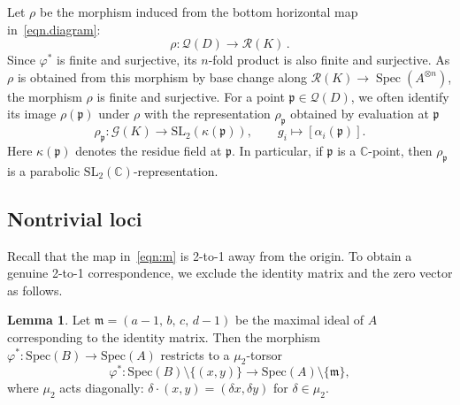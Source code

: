 \documentclass[12pt,reqno]{amsart}
\newcommand{\BC}{\mathbb{C}}
\newcommand{\calQ}{\mathcal{Q}}
\newcommand{\calG}{\mathcal{G}}
\newcommand{\calR}{\mathcal{R}}
\newcommand{\SL}{\mathrm{SL}}
\newcommand{\Spec}{\mathrm{Spec}}
\theoremstyle{definition}
\newtheorem{lemma}[theorem]{Lemma}
\begin{document}
	Let $\rho$ be the morphism induced from the bottom horizontal map in~\eqref{eqn.diagram}:
	\begin{equation} \label{eqn.rho}
		\rho : \calQ(D) \longrightarrow \calR(K)	\,.
	\end{equation}
	Since $\varphi^*$ is finite and surjective, its $n$-fold product is also finite and surjective. As $\rho$ is obtained from this morphism by base change along $\mathcal R(K)\to\operatorname{Spec}(A^{\otimes n})$, the morphism $\rho$ is finite and surjective. 
    For a point $\mathfrak{p}\in\calQ(D)$, we often identify its image $\rho(\mathfrak{p})$ under $\rho$ with the representation $\rho_\mathfrak{p}$ obtained by evaluation at $\mathfrak{p}$
    \begin{equation}\label{eqn:rhop}
    \rho_{\mathfrak p}: \calG(K)\longrightarrow\SL_2  (\kappa(\mathfrak p)), \qquad
    g_i\longmapsto[\alpha_i(\mathfrak p)].
    \end{equation}
    Here $\kappa(\mathfrak p)$ denotes the residue field at $\mathfrak p$. In particular, if $\mathfrak{p}$ is a $\BC$-point, then $\rho_{\mathfrak{p}}$ is a parabolic $\SL_2(\BC)$-representation.

    \subsection{Nontrivial loci} \label{sec.nontri}
    Recall that the map in~\eqref{eqn:m} is 2-to-1 away from the origin. To obtain a genuine 2-to-1 correspondence, we exclude the identity matrix and the zero vector as follows.
	
	\begin{lemma}\label{lem.torsor}
		Let $\mathfrak{m}=(a-1,\,b,\,c,\, d-1)$
		be the maximal ideal of $A$ corresponding to the identity matrix. Then the morphism $\varphi^\ast : \Spec(B) \rightarrow \Spec(A)$ restricts to a $\mu_2$-torsor
		\[
		      \varphi^\ast : \Spec(B)\setminus\{(x,y)\} \longrightarrow \Spec(A)\setminus\{\mathfrak{m}\},
		\]
		where $\mu_2$ acts diagonally: $\delta\cdot(x,y)=(\delta x,\delta y)$ for $\delta\in\mu_2$.
	\end{lemma}
	
\end{document}
